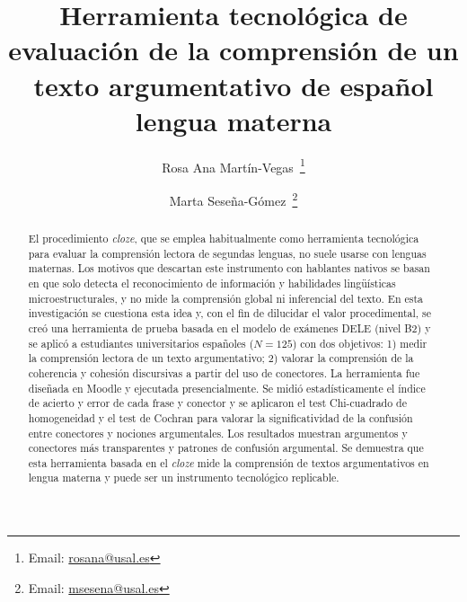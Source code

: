 \documentclass[spanish]{textolivre}
\title{Herramienta tecnológica de evaluación de la comprensión de un texto argumentativo de español lengua materna}
\author[1]{Rosa Ana Martín-Vegas~\orcid{0000-0002-7573-9243}\thanks{Email: \href{rosana@usal.es}{rosana@usal.es}}}
\author[1]{Marta Seseña-Gómez~\orcid{0000-0001-6431-1148}\thanks{Email: \href{msesena@usal.es}{msesena@usal.es}}}
\affil[2]{Universidad de Salamanca, Salamanca, España.}
\begin{document}
\maketitle

\begin{polyabstract}
\begin{abstract}
El procedimiento \emph{cloze}, que se emplea habitualmente como herramienta tecnológica para evaluar la comprensión lectora de segundas lenguas, no suele usarse con lenguas maternas. Los motivos que descartan este instrumento con hablantes nativos se basan en que solo detecta el reconocimiento de información y habilidades lingüísticas microestructurales, y no mide la comprensión global ni inferencial del texto. En esta investigación se cuestiona esta idea y, con el fin de dilucidar el valor procedimental, se creó una herramienta de prueba basada en el modelo de exámenes DELE (nivel B2) y se aplicó a estudiantes universitarios españoles ($N=125$) con dos objetivos: 1) medir la comprensión lectora de un texto argumentativo; 2) valorar la comprensión de la coherencia y cohesión discursivas a partir del uso de conectores. La herramienta fue diseñada en Moodle y ejecutada presencialmente. Se midió estadísticamente el índice de acierto y error de cada frase y conector y se aplicaron el test Chi-cuadrado de homogeneidad y el test de Cochran para valorar la significatividad de la confusión entre conectores y nociones argumentales. Los resultados muestran argumentos y conectores más transparentes y patrones de confusión argumental. Se demuestra que esta herramienta basada en el \emph{cloze} mide la comprensión de textos argumentativos en lengua materna y puede ser un instrumento tecnológico replicable.

\end{abstract}


\end{polyabstract}
\end{document}
